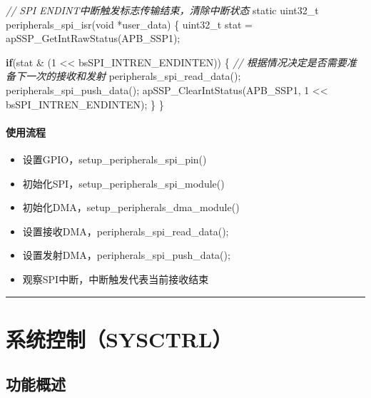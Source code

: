 \documentclass[
  12pt,
]{book}
\newenvironment{Shaded}{\begin{snugshade}}{\end{snugshade}}
\newcommand{\CommentTok}[1]{\textcolor[rgb]{0.56,0.35,0.01}{\textit{#1}}}
\newcommand{\ControlFlowTok}[1]{\textcolor[rgb]{0.13,0.29,0.53}{\textbf{#1}}}
\newcommand{\DataTypeTok}[1]{\textcolor[rgb]{0.13,0.29,0.53}{#1}}
\newcommand{\DecValTok}[1]{\textcolor[rgb]{0.00,0.00,0.81}{#1}}
\newcommand{\NormalTok}[1]{#1}
\providecommand{\tightlist}{%
  \setlength{\itemsep}{0pt}\setlength{\parskip}{0pt}}
\begin{document}
\begin{Shaded}
\begin{Highlighting}[]
\CommentTok{// SPI ENDINT中断触发标志传输结束，清除中断状态}
\DataTypeTok{static} \DataTypeTok{uint32_t}\NormalTok{ peripherals_spi_isr(}\DataTypeTok{void}\NormalTok{ *user_data)}
\NormalTok{\{}
  \DataTypeTok{uint32_t}\NormalTok{ stat = apSSP_GetIntRawStatus(APB_SSP1);}
  
  \ControlFlowTok{if}\NormalTok{(stat & (}\DecValTok{1}\NormalTok{ << bsSPI_INTREN_ENDINTEN))}
\NormalTok{  \{}
    \CommentTok{// 根据情况决定是否需要准备下一次的接收和发射}
\NormalTok{    peripherals_spi_read_data();}
\NormalTok{    peripherals_spi_push_data();}
\NormalTok{    apSSP_ClearIntStatus(APB_SSP1, }\DecValTok{1}\NormalTok{ << bsSPI_INTREN_ENDINTEN);}
\NormalTok{  \}  }
\NormalTok{\}}
\end{Highlighting}
\end{Shaded}

\hypertarget{ux4f7fux7528ux6d41ux7a0b-15}{%
\subsubsection{使用流程}\label{ux4f7fux7528ux6d41ux7a0b-15}}

\begin{itemize}
\tightlist
\item
  设置GPIO，setup\_peripherals\_spi\_pin()
\item
  初始化SPI，setup\_peripherals\_spi\_module()
\item
  初始化DMA，setup\_peripherals\_dma\_module()
\item
  设置接收DMA，peripherals\_spi\_read\_data();
\item
  设置发射DMA，peripherals\_spi\_push\_data();
\item
  观察SPI中断，中断触发代表当前接收结束
\end{itemize}

\begin{center}\rule{0.5\linewidth}{0.5pt}\end{center}

\hypertarget{ch-sysctrl}{%
\chapter{系统控制（SYSCTRL）}\label{ch-sysctrl}}

\hypertarget{ux529fux80fdux6982ux8ff0-3}{%
\section{功能概述}\label{ux529fux80fdux6982ux8ff0-3}}
\end{document}
